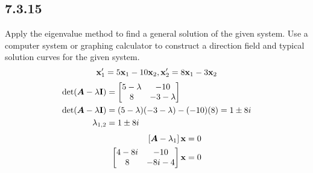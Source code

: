 \documentclass{article}
\begin{document}
\subsection{7.3.15}

Apply the eigenvalue method to find a general solution of the given system. Use a computer system or graphing calculator to construct a direction field and typical solution curves for the given system.
\begin{equation*}
	\vect{x}'_1 = 5\vect{x}_1 - 10\vect{x}_2, \vect{x}'_2 = 8\vect{x}_1 - 3\vect{x}_2
\end{equation*}
\begin{align*}
	\det( \matr{A} - \lambda \vect{I} ) & =
		\begin{bmatrix}
			5 - \lambda & -10 \\
			8 & -3 - \lambda
		\end{bmatrix} \\
	\det( \matr{A} - \lambda \vect{I} ) & =
		(5 - \lambda)(-3 - \lambda) - (-10)(8) = 1 \pm 8i \\
	\lambda_{1,2} & = 1 \pm 8i
\end{align*}
\begin{align*}
	\left[ \matr{A} - \lambda_1 \right] \vect{x} & = 0 \\
	\begin{bmatrix}
		4 - 8i & -10 \\
		8 & -8i - 4
	\end{bmatrix} \vect{x} & = 0
\end{align*}
\end{document}
